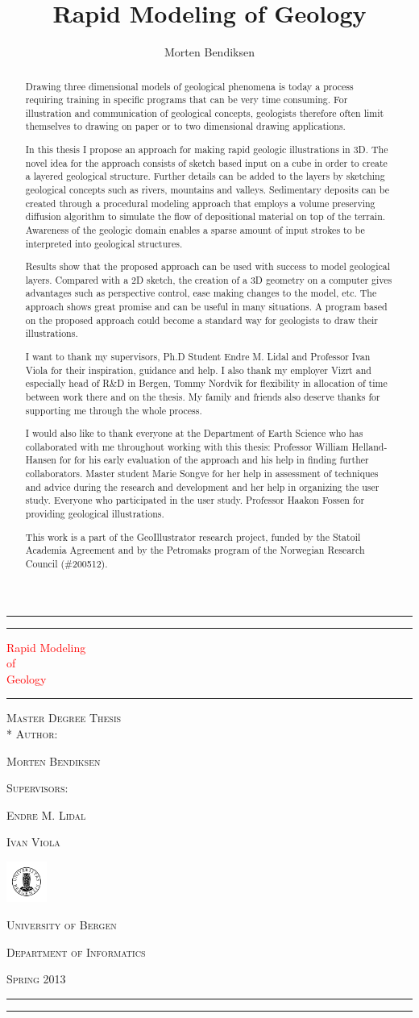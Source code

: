 \documentclass[a4paper,12pt]{report}
\title{Rapid Modeling of Geology}
\author{Morten Bendiksen}
\newcommand*{\plogo}{\includegraphics[width=0.1\textwidth]{uiblogo.pdf}} %
\newcommand*{\titleAT}{\begingroup %
\newlength{\drop} %
\drop=0.06\textheight %

\rule{\textwidth}{1pt}\par %
\vspace{2pt}\vspace{-\baselineskip} %
\rule{\textwidth}{0.4pt}\par %

\vspace{\drop} %
\centering %
\textcolor{Red}{ %
{\Huge Rapid Modeling}\\[0.5\baselineskip] %
{\Large of}\\[0.75\baselineskip] %
{\Huge Geology}} %

\vspace{0.25\drop} %
\rule{0.3\textwidth}{0.4pt}\par %
\vspace{\drop} %


{ 
\textsc{Master Degree Thesis}\\*
\vspace{2\drop}
\textsc{Author:}}\par %
\vspace{0.2\drop}
{\Large \textsc{Morten Bendiksen}}\par %
\vspace{0.5\drop}
{ \textsc{Supervisors:}}\par 
\vspace{0.2\drop}
{\Large \textsc{Endre M. Lidal}}\par 

\vspace{0.1\drop}
{\Large \textsc{Ivan Viola}}\par 

\vfill %


{\large \textcolor{Red}{\plogo}}\par %
{\large \textsc{University of Bergen}}\par %
{\large \textsc{Department of Informatics}}\par %
{\large \textsc{Spring 2013}}\par %

\vspace*{\drop} %

\rule{\textwidth}{0.4pt}\par %
\vspace{2pt}\vspace{-\baselineskip} %
\rule{\textwidth}{1pt}\par %

\endgroup}
\begin{document}
\pagestyle{empty} 
\titleAT


\clearpage
\begin{abstract}


Drawing three dimensional models of geological phenomena is today a process requiring training in specific programs that can be very time consuming. For illustration and communication of geological concepts, geologists therefore often limit themselves to drawing on paper or to two dimensional drawing applications.

In this thesis I propose an approach for making rapid geologic illustrations in 3D. The novel idea for the approach consists of sketch based input on a cube in order to create a layered geological structure. Further details can be added to the layers by sketching geological concepts such as rivers, mountains and valleys. Sedimentary deposits can be created through a procedural modeling approach that employs a volume preserving diffusion algorithm to simulate the flow of depositional material on top of the terrain. Awareness of the geologic domain enables a sparse amount of input strokes to be interpreted into geological structures.

Results show that the proposed approach can be used with success to model geological layers. Compared with a 2D sketch, the creation of a 3D geometry on a computer gives advantages such as perspective control, ease making changes to the model, etc. The approach shows great promise and can be useful in many situations. A program based on the proposed approach could become a standard way for geologists to draw their illustrations.
\end{abstract}

\renewcommand{\abstractname}{Acknowledgements}
\begin{abstract}

I want to thank my supervisors, Ph.D Student Endre M. Lidal and Professor Ivan Viola for their inspiration, guidance and help. I also thank my employer Vizrt and especially head of R\&D in Bergen, Tommy Nordvik for flexibility in allocation of time between work there and on the thesis. My family and friends also deserve thanks for supporting me through the whole process.

I would also like to thank everyone at the Department of Earth Science who has collaborated with me throughout working with this thesis: Professor William Helland-Hansen for for his early evaluation of the approach and his help in finding further collaborators. Master student Marie Songve for her help in assessment of techniques and advice during the research and development and her help in organizing the user study. Everyone who participated in the user study. Professor Haakon Fossen for providing geological illustrations. 

This work is a part of the GeoIllustrator research project, funded by the Statoil Academia Agreement and by the Petromaks program of the Norwegian Research Council (\#200512).
\end{abstract}
\end{document}
